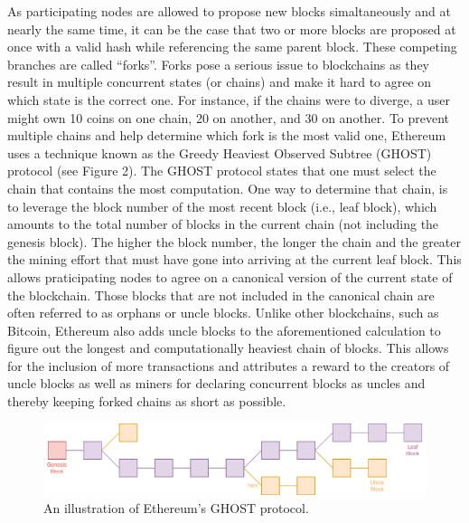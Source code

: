     As participating nodes are allowed to propose new blocks simaltaneously and at nearly the same time, it can be the case that two or more blocks are proposed at once with a valid hash while referencing the same parent block.
    These competing branches are called “forks”.
    Forks pose a serious issue to blockchains as they result in multiple concurrent states (or chains) and make it hard to agree on which state is the correct one.
    For instance, if the chains were to diverge, a user might own 10 coins on one chain, 20 on another, and 30 on another.
    To prevent multiple chains and help determine which fork is the most valid one, Ethereum uses a technique known as the Greedy Heaviest Observed Subtree (GHOST) protocol (see Figure 2).
    The GHOST protocol states that one must select the chain that contains the most computation.
    One way to determine that chain, is to leverage the block number of the most recent block (i.e., leaf block), which amounts to the total number of blocks in the current chain (not including the genesis block).
    The higher the block number, the longer the chain and the greater the mining effort that must have gone into arriving at the current leaf block.
    This allows praticipating nodes to agree on a canonical version of the current state of the blockchain.
    Those blocks that are not included in the canonical chain are often referred to as orphans or uncle blocks.
    Unlike other blockchains, such as Bitcoin, Ethereum also adds uncle blocks to the aforementioned calculation to figure out the longest and computationally heaviest chain of blocks.
    This allows for the inclusion of more transactions and attributes a reward to the creators of uncle blocks as well as miners for declaring concurrent blocks as uncles and thereby keeping forked chains as short as possible.

    \begin{figure}
        \centering
        \includegraphics[width=\textwidth]{figures/uncle.png}
        \caption{An illustration of Ethereum’s GHOST protocol.}
        \label{fig:uncle}
    \end{figure}




